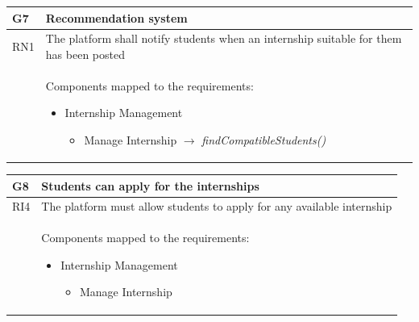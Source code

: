 \documentclass[11pt,twoside]{article}
\begin{document}
\begin{table}[H]
\begin{tabular}{| p{} | p{} |}
\hline
\rowcolor{Gray1}
\textbf{G7} & \textbf{Recommendation system} \\
\hline
\rowcolor{Gray2}
RN1 & The platform shall notify students when an internship suitable for them has been posted \\
\hline
 & Components mapped to the requirements:
\begin{itemize}
\item Internship Management
 	\begin{itemize}
 	\item Manage Internship $\rightarrow$ \textit{findCompatibleStudents()}
 	\end{itemize}
\end{itemize} \\
\hline
\end{tabular}
\end{table}

\begin{table}[H]
\begin{tabular}{| p{} | p{} |}
\hline
\rowcolor{Gray1}
\textbf{G8} & \textbf{Students can apply for the internships} \\
\hline
\rowcolor{Gray2}
RI4 & The platform must allow students to apply for any available internship \\
\hline
 & Components mapped to the requirements:
\begin{itemize}
\item Internship Management
 	\begin{itemize}
 	\item Manage Internship
 	\end{itemize}
\end{itemize} \\
\hline
\end{tabular}
\end{table}

\newpage
\end{document}
